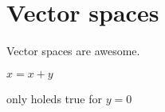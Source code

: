 
\section{Vector spaces}
\begin{definition}
  Vector spaces are awesome. 
\end{definition}

\begin{intuition}
  \( x = x + y\)
\end{intuition}
only holeds true for \( y = 0 \)
